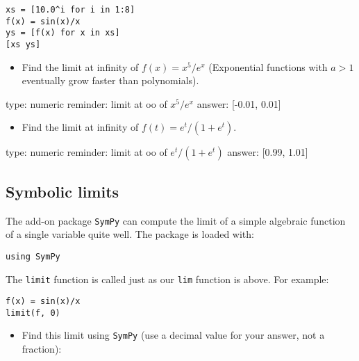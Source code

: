 \documentclass[12pt]{article}
\begin{document}
\begin{verbatim}
xs = [10.0^i for i in 1:8]
f(x) = sin(x)/x
ys = [f(x) for x in xs]
[xs ys]
\end{verbatim}
\begin{itemize}
\itemsep1pt\parskip0pt
\item
  Find the limit at infinity of $f(x) = x^5/e^x$ (Exponential functions
  with $a>1$ eventually grow faster than polynomials).
\end{itemize}

\begin{answer}
    type: numeric
    reminder: limit at oo of \( x^5/e^x \)
    answer: [-0.01, 0.01]

\end{answer}

\begin{itemize}
\itemsep1pt\parskip0pt
\item
  Find the limit at infinity of $f(t) = e^t / (1 + e^t)$.
\end{itemize}

\begin{answer}
    type: numeric
    reminder: limit at oo of \( e^t / (1 + e^t) \)
    answer: [0.99, 1.01]

\end{answer}

\subsection{Symbolic limits}

The add-on package \texttt{SymPy} can compute the limit of a simple
algebraic function of a single variable quite well. The package is
loaded with:



\begin{verbatim}
using SymPy
\end{verbatim}
The \texttt{limit} function is called just as our \texttt{lim} function
is above. For example:



\begin{verbatim}
f(x) = sin(x)/x
limit(f, 0)
\end{verbatim}
\begin{itemize}
\itemsep1pt\parskip0pt
\item
  Find this limit using \texttt{SymPy} (use a decimal value for your
  answer, not a fraction):
\end{itemize}
\end{document}
